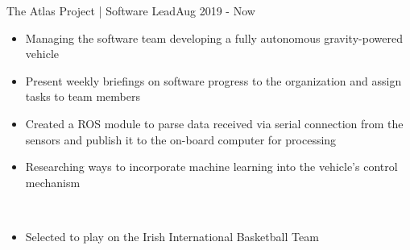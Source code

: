 
\begin{projects}

    \extracurricular
    {The Atlas Project | Software Lead}{Aug 2019 - Now}
    {
	    \begin{itemize}
    	    \item Managing the software team developing a fully autonomous gravity-powered vehicle
    	    \item Present weekly briefings on software progress to the organization and assign tasks to team members
    	    \item Created a ROS module to parse data received via serial connection from the sensors and publish it to the on-board computer for processing
    	    \item Researching ways to incorporate machine learning into the vehicle's control mechanism
		\end{itemize}
    }
	\\

	\smallskip

    {
    \begin{itemize}
        \item Selected to play on the Irish International Basketball Team
    \end{itemize}
    }

\end{projects}
